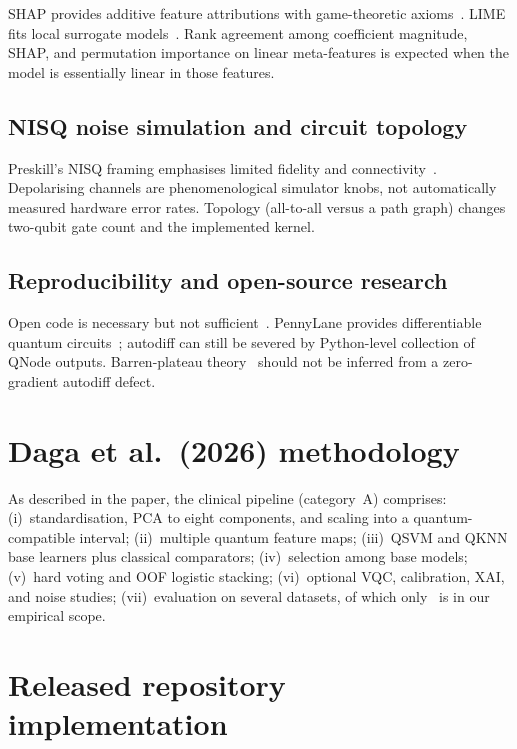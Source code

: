 \documentclass[11pt,a4paper]{article}
\begin{document}
SHAP provides additive feature attributions with game-theoretic axioms~\cite{lundberg2017unified}. LIME fits local surrogate models~\cite{ribeiro2016why}. Rank agreement among coefficient magnitude, SHAP, and permutation importance on linear meta-features is expected when the model is essentially linear in those features.

\subsection{NISQ noise simulation and circuit topology}

Preskill's NISQ framing emphasises limited fidelity and connectivity~\cite{preskill2018quantum}. Depolarising channels are phenomenological simulator knobs, not automatically measured hardware error rates. Topology (all-to-all versus a path graph) changes two-qubit gate count and the implemented kernel.

\subsection{Reproducibility and open-source research}

Open code is necessary but not sufficient~\cite{pineau2021improving}. PennyLane provides differentiable quantum circuits~\cite{bergholm2018pennylane}; autodiff can still be severed by Python-level collection of QNode outputs. Barren-plateau theory~\cite{mcclean2018barren} should not be inferred from a zero-gradient autodiff defect.

\section{Daga et al.\ (2026) methodology}
\label{sec:daga-methods}

As described in the paper, the clinical pipeline (category~A) comprises: (i)~standardisation, PCA to eight components, and scaling into a quantum-compatible interval; (ii)~multiple quantum feature maps; (iii)~QSVM and QKNN base learners plus classical comparators; (iv)~selection among base models; (v)~hard voting and OOF logistic stacking; (vi)~optional VQC, calibration, XAI, and noise studies; (vii)~evaluation on several datasets, of which only \wdbc\ is in our empirical scope.

\section{Released repository implementation}
\label{sec:released}
\end{document}
